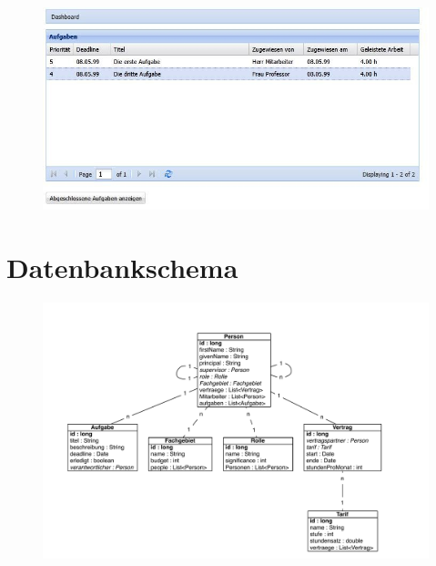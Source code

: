 \documentclass[article,colorback,accentcolor=tud2c]{tudreport}
\begin{document}
\begin{figure}[h]
    \begin{center}
        \includegraphics[scale=0.7]{img/hiwi-dashboard}
    \end{center}
\end{figure}


\newpage

\section{Datenbankschema} %
\label{sec:datenbankschema}

\begin{figure}[h]
    \begin{center}
        \includegraphics[scale=0.65]{img/db}
    \end{center}
\end{figure}

\end{document}
